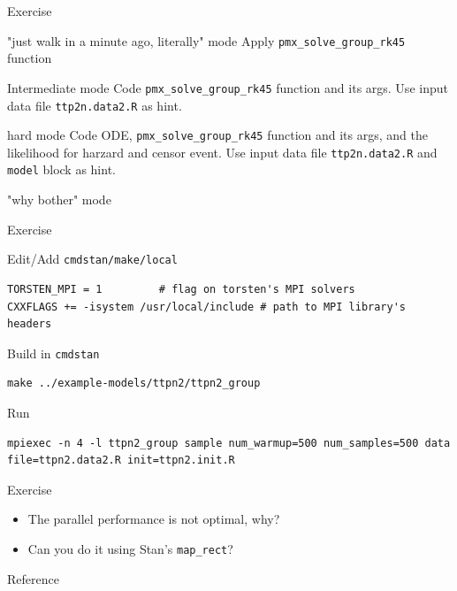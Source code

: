 \documentclass[presentation]{beamer}
\begin{document}
\begin{frame}[fragile,label={sec:org86acc89}]{Exercise}
 \begin{block}{"just walk in a minute ago, literally" mode}
Apply \texttt{pmx\_solve\_group\_rk45} function
\end{block}
\begin{block}{Intermediate mode}
Code \texttt{pmx\_solve\_group\_rk45} function and its args. Use input data file \texttt{ttp2n.data2.R} as hint.
\end{block}
\begin{block}{hard mode}
Code ODE, \texttt{pmx\_solve\_group\_rk45} function and its args,
and the likelihood for harzard and censor event. Use input
data file \texttt{ttp2n.data2.R} and \texttt{model} block as hint.
\end{block}
\begin{block}{"why bother" mode}
\end{block}
\end{frame}

\begin{frame}[fragile,label={sec:org9c3fb14}]{Exercise}
 \begin{block}{Edit/Add \texttt{cmdstan/make/local}}
\begin{verbatim}
TORSTEN_MPI = 1         # flag on torsten's MPI solvers
CXXFLAGS += -isystem /usr/local/include # path to MPI library's headers
\end{verbatim}
\end{block}
\begin{block}{Build in \texttt{cmdstan}}
\begin{verbatim}
make ../example-models/ttpn2/ttpn2_group
\end{verbatim}
\end{block}
\begin{block}{Run}
\begin{verbatim}
mpiexec -n 4 -l ttpn2_group sample num_warmup=500 num_samples=500 data file=ttpn2.data2.R init=ttpn2.init.R
\end{verbatim}
\end{block}
\end{frame}

\begin{frame}[fragile,label={sec:org2c09db3}]{Exercise}
 \begin{itemize}
\item The parallel performance is not optimal, why?
\item Can you do it using Stan's \texttt{map\_rect}?
\end{itemize}
\end{frame}

\begin{frame}[label={sec:orgfdb92dd}]{Reference}


\end{frame}
\end{document}
